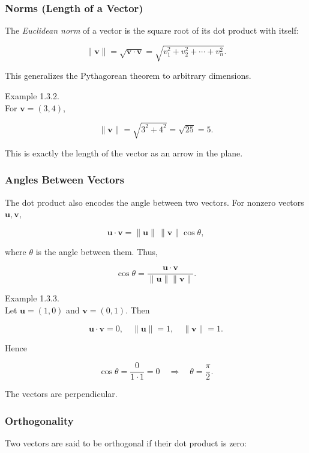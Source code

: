 \documentclass[
  12pt,
  a4paper,
]{article}
\begin{document}
\subsubsection{Norms (Length of a
Vector)}\label{norms-length-of-a-vector}

The \emph{Euclidean norm} of a vector is the square root of its dot
product with itself:

\[\|\mathbf{v}\| = \sqrt{\mathbf{v} \cdot \mathbf{v}} = \sqrt{v_1^2 + v_2^2 + \cdots + v_n^2}.\]

This generalizes the Pythagorean theorem to arbitrary dimensions.

Example 1.3.2.\\
For \(\mathbf{v} = (3, 4)\),

\[\|\mathbf{v}\| = \sqrt{3^2 + 4^2} = \sqrt{25} = 5.\]

This is exactly the length of the vector as an arrow in the plane.

\subsubsection{Angles Between Vectors}\label{angles-between-vectors}

The dot product also encodes the angle between two vectors. For nonzero
vectors \(\mathbf{u}, \mathbf{v}\),

\[\mathbf{u} \cdot \mathbf{v} = \|\mathbf{u}\| \, \|\mathbf{v}\| \cos \theta,\]

where \(\theta\) is the angle between them. Thus,

\[\cos \theta = \frac{\mathbf{u} \cdot \mathbf{v}}{\|\mathbf{u}\|\|\mathbf{v}\|}.\]

Example 1.3.3.\\
Let \(\mathbf{u} = (1,0)\) and \(\mathbf{v} = (0,1)\). Then

\[\mathbf{u} \cdot \mathbf{v} = 0, \quad \|\mathbf{u}\| = 1, \quad \|\mathbf{v}\| = 1.\]

Hence

\[\cos \theta = \frac{0}{1\cdot 1} = 0 \quad \Rightarrow \quad \theta = \frac{\pi}{2}.\]

The vectors are perpendicular.

\subsubsection{Orthogonality}\label{orthogonality}

Two vectors are said to be orthogonal if their dot product is zero:
\end{document}
